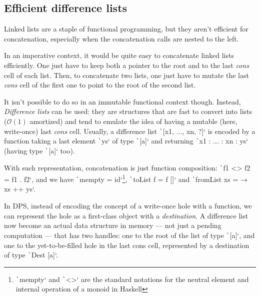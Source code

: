 \documentclass[english]{jflart}
\begin{document}
\subsection{Efficient difference lists}\label{ssec:dlist}

Linked lists are a staple of functional programming, but they aren't efficient for concatenation, especially when the concatenation calls are nested to the left.

In an imperative context, it would be quite easy to concatenate linked lists efficiently. One just have to keep both a pointer to the root and to the last \emph{cons} cell of each list. Then, to concatenate two lists, one just have to mutate the last \emph{cons} cell of the first one to point to the root of the second list.

It isn't possible to do so in an immutable functional context though. Instead, \emph{Difference lists} can be used: they are structures that are fast to convert into lists ($\mathcal{O}(1)$ amortized) and tend to emulate the idea of having a mutable (here, write-once) last \emph{cons} cell. Usually, a difference list \texttt`[x1, ..., xn, ?]` is encoded by a function taking a last element \texttt`ys` of type \texttt`[a]` and returning \texttt`x1 : ... : xn : ys` (having type \texttt`[a]` too).

With such representation, concatenation is just function composition: \texttt`f1 <> f2 = f1 . f2`, and we have \texttt`mempty = id`\footnote{\texttt`mempty` and \texttt`<>` are the standard notations for the neutral element and internal operation of a monoid in Haskell}, \texttt`toList f = f []` and \texttt`fromList xs = \ys → xs ++ ys`.

In DPS, instead of encoding the concept of a write-once hole with a function, we can represent the hole as a first-class object with a \emph{destination}. A difference list now become an actual data structure in memory --- not just a pending computation --- that has two handles: one to the root of the list of type \texttt`[a]`, and one to the yet-to-be-filled hole in the last cons cell, represented by a destination of type \texttt`Dest [a]`.
\end{document}
